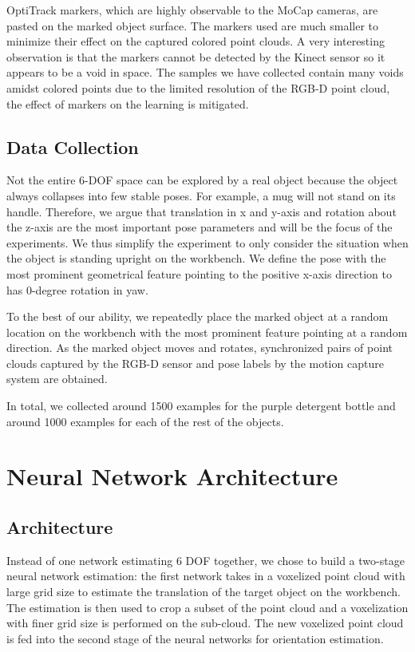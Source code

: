 \documentclass[conference]{IEEEtran}
\begin{document}
OptiTrack markers, which are highly observable to the MoCap cameras, are pasted on the marked object surface. The markers used are much smaller to minimize their effect on the captured colored point clouds. A very interesting observation is that the markers cannot be detected by the Kinect sensor so it appears to be a void in space. The samples we have collected contain many voids amidst colored points due to the limited resolution of the RGB-D point cloud, the effect of markers on the learning is mitigated.

\subsection{Data Collection}
Not the entire 6-DOF space can be explored by a real object because the object always collapses into few stable poses. For example, a mug will not stand on its handle. Therefore, we argue that translation in x and y-axis and rotation about the z-axis are the most important pose parameters and will be the focus of the experiments. We thus simplify the experiment to only consider the situation when the object is standing upright on the workbench. We define the pose with the most prominent geometrical feature pointing to the positive x-axis direction to has 0-degree rotation in yaw.

To the best of our ability, we repeatedly place the marked object at a random location on the workbench with the most prominent feature pointing at a random direction. As the marked object moves and rotates, synchronized pairs of point clouds captured by the RGB-D sensor and pose labels by the motion capture system are obtained.

In total, we collected around 1500 examples for the purple detergent bottle and around 1000 examples for each of the rest of the objects.


\section{Neural Network Architecture}
\subsection{Architecture}
Instead of one network estimating 6 DOF together, we chose to build a two-stage neural network estimation: the first network takes in a voxelized point cloud with large grid size to estimate the translation of the target object on the workbench. The estimation is then used to crop a subset of the point cloud and a voxelization with finer grid size is performed on the sub-cloud. The new voxelized point cloud is fed into the second stage of the neural networks for orientation estimation.
\end{document}
